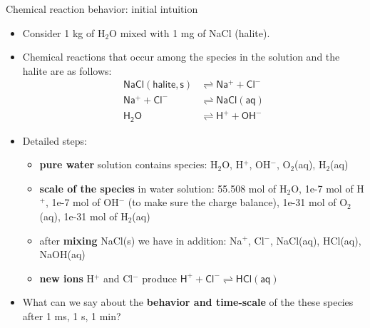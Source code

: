\begin{frame}[<+->]{Chemical reaction behavior: initial intuition}
	\vskip 5pt
\begin{itemize}
\item Consider 1 kg of H$_{2}$O mixed with 1 mg of NaCl (halite). 
\item Chemical reactions that occur among the species in the solution and the halite are as follows:\\[-30pt]
\begin{align*}
\mathsf{NaCl(halite, s)} & \rightleftharpoons\mathsf{Na^{+}+Cl^{-}}\\
\mathsf{Na^{+}+Cl^{-}} & \rightleftharpoons\mathsf{NaCl(aq)}\\
\mathsf{H_{2}O} & \rightleftharpoons\mathsf{H^{+}+OH^{-}}
\end{align*}
\item Detailed steps: 
\begin{itemize}
\item \textbf{pure water} solution contains species: H$_2$O, H$^+$, OH$^-$, O$_2$(aq), H$_2$(aq)
\item \textbf{scale of the species} in water solution: 
55.508 mol of H$_2$O, 1e-7 mol of H$^+$, 1e-7 mol of OH$^-$ (to make sure the charge balance),
 1e-31 mol of O$_2$(aq),  1e-31 mol of H$_2$(aq) 
\item after \textbf{mixing} NaCl(s) we have in addition: Na$^{+}$, Cl$^{-}$, NaCl(aq), HCl(aq), NaOH(aq)
\item  \textbf{new ions} H$^+$ and Cl$^{-}$ produce $\mathsf{H^{+}+Cl^{-}} \rightleftharpoons \mathsf{HCl(aq)}$
\end{itemize}
\item What can we say about the \alert{\textbf{behavior and time-scale}} of the these species after 1 ms, 1 s, 1 min?
\end{itemize}
\end{frame}
%

